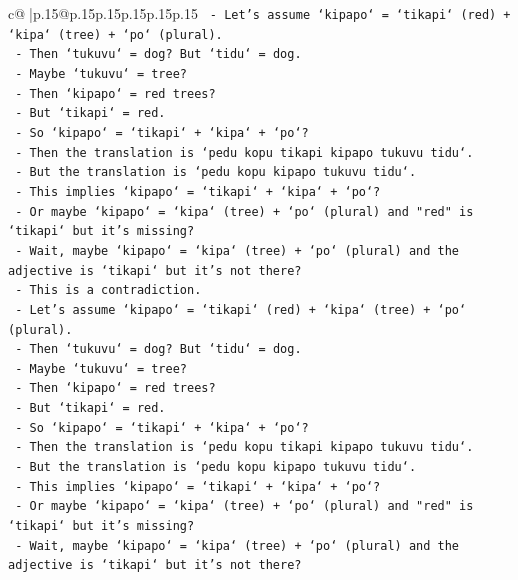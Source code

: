 \documentclass{article}
\begin{document}
{\begin{supertabular}{c@{$\;$}|p{.15\linewidth}@{}p{.15\linewidth}p{.15\linewidth}p{.15\linewidth}p{.15\linewidth}p{.15\linewidth}}
{{{\texttt{          {-} Let's assume `kipapo` = `tikapi` (red) + `kipa` (tree) + `po` (plural).} \\
\texttt{          {-} Then `tukuvu` = dog? But `tidu` = dog.} \\
\texttt{          {-} Maybe `tukuvu` = tree?} \\
\texttt{          {-} Then `kipapo` = red trees?} \\
\texttt{          {-} But `tikapi` = red.} \\
\texttt{          {-} So `kipapo` = `tikapi` + `kipa` + `po`?} \\
\texttt{          {-} Then the translation is `pedu kopu tikapi kipapo tukuvu tidu`.} \\
\texttt{          {-} But the translation is `pedu kopu kipapo tukuvu tidu`.} \\
\texttt{          {-} This implies `kipapo` = `tikapi` + `kipa` + `po`?} \\
\texttt{          {-} Or maybe `kipapo` = `kipa` (tree) + `po` (plural) and "red" is `tikapi` but it's missing?} \\
\texttt{          {-} Wait, maybe `kipapo` = `kipa` (tree) + `po` (plural) and the adjective is `tikapi` but it's not there?} \\
\texttt{          {-} This is a contradiction.} \\
\texttt{          {-} Let's assume `kipapo` = `tikapi` (red) + `kipa` (tree) + `po` (plural).} \\
\texttt{          {-} Then `tukuvu` = dog? But `tidu` = dog.} \\
\texttt{          {-} Maybe `tukuvu` = tree?} \\
\texttt{          {-} Then `kipapo` = red trees?} \\
\texttt{          {-} But `tikapi` = red.} \\
\texttt{          {-} So `kipapo` = `tikapi` + `kipa` + `po`?} \\
\texttt{          {-} Then the translation is `pedu kopu tikapi kipapo tukuvu tidu`.} \\
\texttt{          {-} But the translation is `pedu kopu kipapo tukuvu tidu`.} \\
\texttt{          {-} This implies `kipapo` = `tikapi` + `kipa` + `po`?} \\
\texttt{          {-} Or maybe `kipapo` = `kipa` (tree) + `po` (plural) and "red" is `tikapi` but it's missing?} \\
\texttt{          {-} Wait, maybe `kipapo` = `kipa` (tree) + `po` (plural) and the adjective is `tikapi` but it's not there?} \\
}}}
\end{supertabular}}
\end{document}
